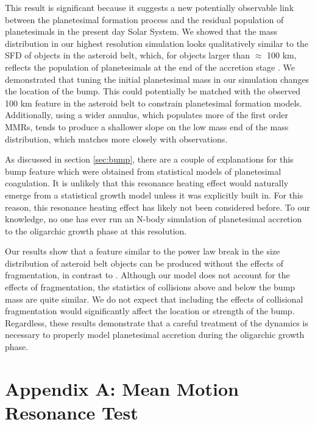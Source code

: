 This result is significant because it suggests a new potentially observable link between the planetesimal formation process and 
the residual population of planetesimals in the present day Solar System. We showed that the mass distribution in our highest 
resolution simulation looks qualitatively similar to the SFD of objects in the asteroid belt, which, for objects larger than $\approx$ 
100 km, reflects the population of planetesimals at the end of the accretion stage \cite{morbidelli09}. We demonstrated that 
tuning the initial planetesimal mass in our simulation changes the location of the bump. This could potentially be matched with 
the observed 100 km feature in the asteroid belt to constrain planetesimal formation models. Additionally, using a wider annulus, 
which populates more of the first order MMRs, tends to produce a shallower slope on the low mass end of the mass distribution, 
which matches more closely with observations.

As discussed in section \ref{sec:bump}, there are a couple of explanations for this bump feature which were obtained from 
statistical models of planetesimal coagulation. It is unlikely that this resonance heating effect would naturally emerge from a 
statistical growth model unless it was explicitly built in. For this reason, this resonance heating effect has likely not been 
considered before. To our knowledge, no one has ever run an N-body simulation of planetesimal accretion to the oligarchic 
growth phase at this resolution.

Our results show that a feature similar to the power law break in the size distribution of asteroid belt objects can be produced 
without the effects of fragmentation, in contrast to \cite{morbidelli09}. Although our model does not account for the effects of 
fragmentation, the statistics of collisions above and below the bump mass are quite similar. We do not expect that including the 
effects of collisional fragmentation would significantly affect the location or strength of the bump. Regardless, these results 
demonstrate that a careful treatment of the dynamics is necessary to properly model planetesimal accretion during the oligarchic 
growth phase.


\section{Appendix A: Mean Motion Resonance Test}

